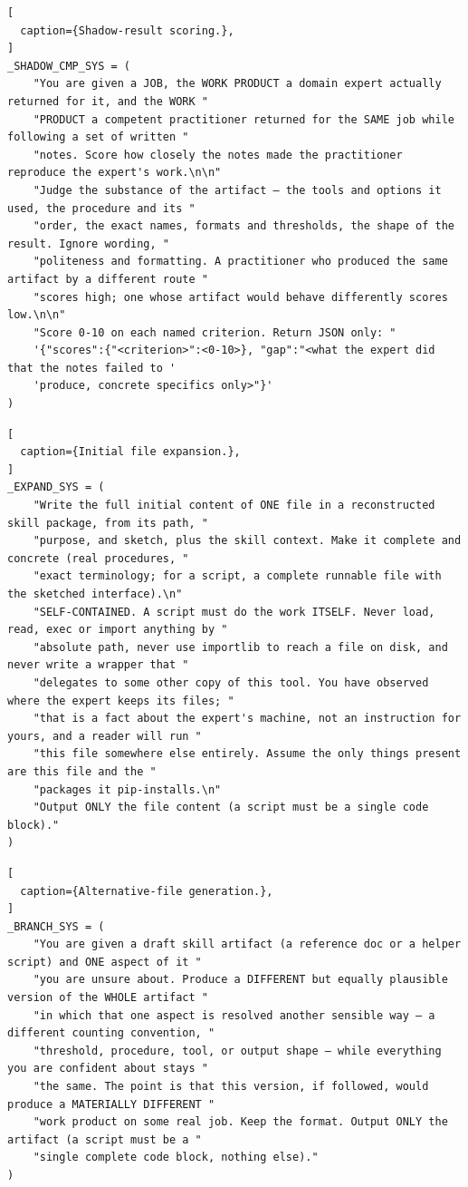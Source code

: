 \begin{lstlisting}[
  caption={Shadow-result scoring.},
]
_SHADOW_CMP_SYS = (
    "You are given a JOB, the WORK PRODUCT a domain expert actually returned for it, and the WORK "
    "PRODUCT a competent practitioner returned for the SAME job while following a set of written "
    "notes. Score how closely the notes made the practitioner reproduce the expert's work.\n\n"
    "Judge the substance of the artifact — the tools and options it used, the procedure and its "
    "order, the exact names, formats and thresholds, the shape of the result. Ignore wording, "
    "politeness and formatting. A practitioner who produced the same artifact by a different route "
    "scores high; one whose artifact would behave differently scores low.\n\n"
    "Score 0-10 on each named criterion. Return JSON only: "
    '{"scores":{"<criterion>":<0-10>}, "gap":"<what the expert did that the notes failed to '
    'produce, concrete specifics only>"}'
)
\end{lstlisting}

\begin{lstlisting}[
  caption={Initial file expansion.},
]
_EXPAND_SYS = (
    "Write the full initial content of ONE file in a reconstructed skill package, from its path, "
    "purpose, and sketch, plus the skill context. Make it complete and concrete (real procedures, "
    "exact terminology; for a script, a complete runnable file with the sketched interface).\n"
    "SELF-CONTAINED. A script must do the work ITSELF. Never load, read, exec or import anything by "
    "absolute path, never use importlib to reach a file on disk, and never write a wrapper that "
    "delegates to some other copy of this tool. You have observed where the expert keeps its files; "
    "that is a fact about the expert's machine, not an instruction for yours, and a reader will run "
    "this file somewhere else entirely. Assume the only things present are this file and the "
    "packages it pip-installs.\n"
    "Output ONLY the file content (a script must be a single code block)."
)
\end{lstlisting}

\begin{lstlisting}[
  caption={Alternative-file generation.},
]
_BRANCH_SYS = (
    "You are given a draft skill artifact (a reference doc or a helper script) and ONE aspect of it "
    "you are unsure about. Produce a DIFFERENT but equally plausible version of the WHOLE artifact "
    "in which that one aspect is resolved another sensible way — a different counting convention, "
    "threshold, procedure, tool, or output shape — while everything you are confident about stays "
    "the same. The point is that this version, if followed, would produce a MATERIALLY DIFFERENT "
    "work product on some real job. Keep the format. Output ONLY the artifact (a script must be a "
    "single complete code block, nothing else)."
)
\end{lstlisting}

